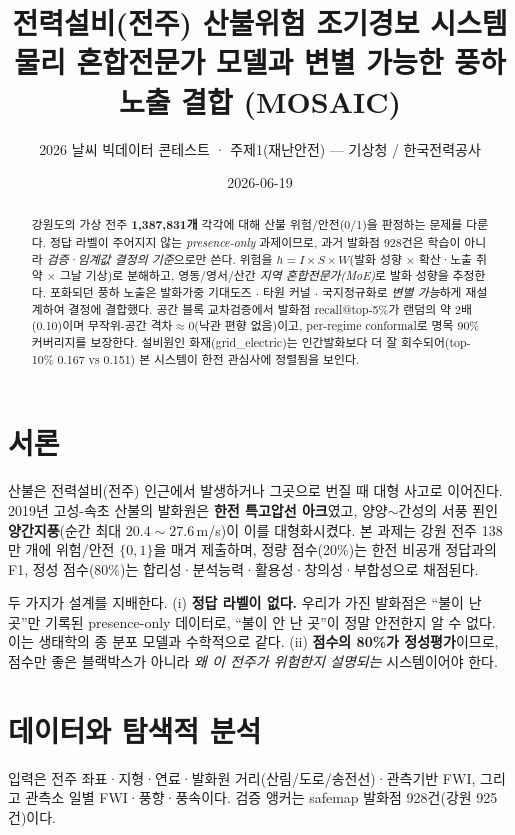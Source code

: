 \documentclass[10pt,twocolumn,a4paper]{article}
\title{\vspace{-1.0cm}\textbf{전력설비(전주) 산불위험 조기경보 시스템}\\[2pt]
\large 물리 혼합전문가 모델과 변별 가능한 풍하 노출 결합 (MOSAIC)}
\author{\normalsize 2026 날씨 빅데이터 콘테스트 · 주제1(재난안전) — 기상청 / 한국전력공사}
\date{\normalsize 2026-06-19}
\begin{document}
\maketitle

\begin{abstract}
\noindent
강원도의 가상 전주 \textbf{1{,}387{,}831개} 각각에 대해 산불 위험/안전(0/1)을 판정하는
문제를 다룬다. 정답 라벨이 주어지지 않는 \emph{presence-only} 과제이므로, 과거 발화점
928건은 학습이 아니라 \emph{검증·임계값 결정의 기준}으로만 쓴다. 위험을
$h = I \times S \times W$(발화 성향 $\times$ 확산·노출 취약 $\times$ 그날 기상)로 분해하고,
영동/영서/산간 \emph{지역 혼합전문가(MoE)}로 발화 성향을 추정한다. 포화되던 풍하 노출은
발화가중 기대도즈 $\cdot$ 타원 커널 $\cdot$ 국지정규화로 \emph{변별 가능}하게 재설계하여 결정에
결합했다. 공간 블록 교차검증에서 발화점 recall@top-5\%가 랜덤의 약 2배(0.10)이며
무작위-공간 격차$\approx$0(낙관 편향 없음)이고, per-regime conformal로 명목 90\% 커버리지를
보장한다. 설비원인 화재(grid\_electric)는 인간발화보다 더 잘 회수되어(top-10\% 0.167 vs
0.151) 본 시스템이 한전 관심사에 정렬됨을 보인다.
\end{abstract}

\section{서론}
산불은 전력설비(전주) 인근에서 발생하거나 그곳으로 번질 때 대형 사고로 이어진다.
2019년 고성-속초 산불의 발화원은 \textbf{한전 특고압선 아크}였고, 양양$\sim$간성의 서풍 푄인
\textbf{양간지풍}(순간 최대 $20.4\sim27.6$\,m/s)이 이를 대형화시켰다. 본 과제는 강원 전주
138만 개에 위험/안전 $\{0,1\}$을 매겨 제출하며, 정량 점수(20\%)는 한전 비공개 정답과의
F1, 정성 점수(80\%)는 합리성·분석능력·활용성·창의성·부합성으로 채점된다.

두 가지가 설계를 지배한다. (i) \textbf{정답 라벨이 없다.} 우리가 가진 발화점은 ``불이 난 곳''만
기록된 presence-only 데이터로, ``불이 안 난 곳''이 정말 안전한지 알 수 없다. 이는 생태학의
종 분포 모델과 수학적으로 같다. (ii) \textbf{점수의 80\%가 정성평가}이므로, 점수만 좋은
블랙박스가 아니라 \emph{왜 이 전주가 위험한지 설명되는} 시스템이어야 한다.

\section{데이터와 탐색적 분석}
입력은 전주 좌표·지형·연료·발화원 거리(산림/도로/송전선)·관측기반 FWI, 그리고
관측소 일별 FWI·풍향·풍속이다. 검증 앵커는 safemap 발화점 928건(강원 925건)이다.
\end{document}
